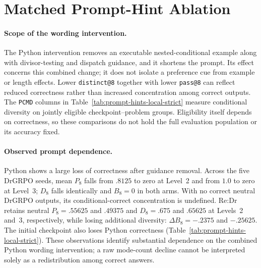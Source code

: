 \documentclass{article}
\newcommand{\1}{\mathbf 1}
\newcommand{\pmd}{\texttt{PCMD}}
\theoremstyle{remark}
\theoremstyle{definition}
\theoremstyle{plain}
\begin{document}
\section{Matched Prompt-Hint Ablation}
\label{app:prompt-hint-ablation}



\paragraph{Scope of the wording intervention.}
The Python intervention removes an executable nested-conditional example
along with divisor-testing and dispatch guidance, and it shortens the prompt.
Its effect concerns this combined change; it does not isolate a preference
cue from example or length effects. Lower \texttt{distinct@8} together with
lower \texttt{pass@8} can reflect reduced correctness rather than increased
concentration among correct outputs. The \pmd{} columns in
Table~\ref{tab:prompt-hints-local-strict} measure conditional diversity on
jointly eligible checkpoint--problem groups. Eligibility itself depends on
correctness, so these comparisons do not hold the full evaluation population
or its accuracy fixed.

\paragraph{Observed prompt dependence.}
Python shows a large loss of correctness after guidance removal. Across the
five DrGRPO seeds, mean $P_8$ falls from $.8125$ to zero at Level~2 and from
$1.0$ to zero at Level~3; $D_8$ falls identically and $B_8=0$ in both arms.
With no correct neutral DrGRPO outputs, its conditional-correct concentration
is undefined. Re:Dr retains neutral $P_8=.55625$ and $.49375$ and
$D_8=.675$ and $.65625$ at Levels~2 and~3, respectively, while losing
additional diversity: $\Delta B_8=-.2375$ and $-.25625$. The initial checkpoint
also loses Python correctness (Table~\ref{tab:prompt-hints-local-strict}).
These observations identify substantial dependence on the combined Python
wording intervention; a raw mode-count decline cannot be interpreted solely
as a redistribution among correct answers.
\end{document}
